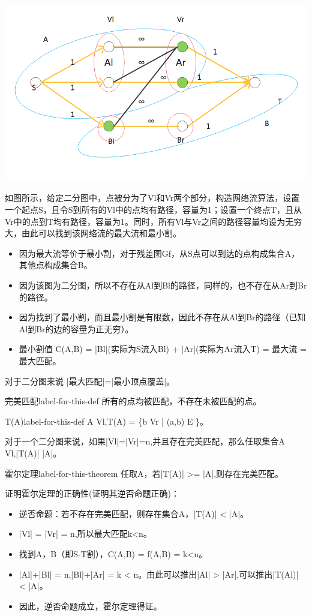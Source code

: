 \centerline{\includegraphics[scale=0.6]{Ln11.image/networkflow3.png}}
\begin{example}
  如图所示，给定二分图中，点被分为了Vl和Vr两个部分，构造网络流算法，设置一个起点S，且令S到所有的Vl中的点均有路径，容量为1；设置一个终点T，且从Vr中的点到T均有路径，容量为1。同时，所有Vl与Vr之间的路径容量均设为无穷大，由此可以找到该网络流的最大流和最小割。
\end{example}
\begin{itemize}
  \item 因为最大流等价于最小割，对于残差图Gf，从S点可以到达的点构成集合A，其他点构成集合B。
  \item 因为该图为二分图，所以不存在从Al到Bl的路径，同样的，也不存在从Ar到Br的路径。
  \item 因为找到了最小割，而且最小割是有限数，因此不存在从Al到Br的路径（已知Al到Br的边的容量为正无穷）。
  \item 最小割值 C(A,B) = |Bl|(实际为S流入Bl) + |Ar|(实际为Ar流入T) = 最大流 = 最大匹配。
\end{itemize}
对于二分图来说 |最大匹配|=|最小顶点覆盖|。

\begin{definition}{完美匹配}{label-for-this-def}
    所有的点均被匹配，不存在未被匹配的点。
\end{definition}

\begin{definition}{T(A)}{label-for-this-def}
  A \subseteq Vl,T(A) = \{b \in Vr | (a,b) \in E \}。
\end{definition}

对于一个二分图来说，如果|Vl|=|Vr|=n,并且存在完美匹配，那么任取集合A \subseteq Vl,|T(A)| \ge |A|。

\begin{theorem}{霍尔定理}{label-for-this-theorem}
  任取A\subseteqVl，若|T(A)| >= |A|,则存在完美匹配。
\end{theorem}
证明霍尔定理的正确性(证明其逆否命题正确)：
\begin{itemize}
  \item 逆否命题：若不存在完美匹配，则存在集合A，|T(A)| < |A|。
  \item |Vl| = |Vr| = n,所以最大匹配k<n。
  \item 找到A，B（即S-T割），C(A,B) = f(A,B) = k<n。
  \item |Al|+|Bl| = n,|Bl|+|Ar| = k < n。由此可以推出|Al| > |Ar|,可以推出|T(Al)| < |A|。
  \item 因此，逆否命题成立，霍尔定理得证。
\end{itemize}

